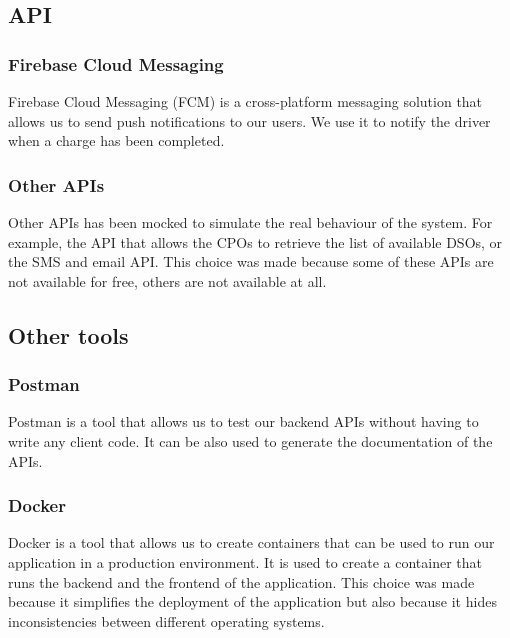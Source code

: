 \subsection{API}
\subsubsection{Firebase Cloud Messaging}
Firebase Cloud Messaging (FCM) is a cross-platform messaging solution that allows us to send push notifications to our users. We use it to notify the driver when a charge has been completed.

\subsubsection{Other APIs}
Other APIs has been mocked to simulate the real behaviour of the system. For example, the API that allows the CPOs to retrieve the list of available DSOs, or the SMS and email API.
This choice was made because some of these APIs are not available for free, others are not available at all.

\subsection{Other tools}
\subsubsection{Postman}
Postman is a tool that allows us to test our backend APIs without having to write any client code. It can be also used to generate the documentation of the APIs.
\subsubsection{Docker}
Docker is a tool that allows us to create containers that can be used to run our application in a production environment. It is used to create a container that runs the backend and the frontend of the application.
This choice was made because it simplifies the deployment of the application but also because it hides inconsistencies between different operating systems.



